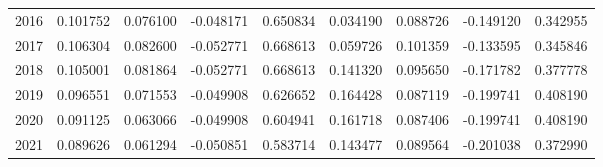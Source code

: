 \begin{table}[!ht]
\begin{tabularx}{\textwidth}{XXXXXXXXX}
    2016 &   0.101752 &     0.076100 & -0.048171 &  0.650834 &  0.034190 &    0.088726 & -0.149120 & 0.342955 \\
    2017 &   0.106304 &     0.082600 & -0.052771 &  0.668613 &  0.059726 &    0.101359 & -0.133595 & 0.345846 \\
    2018 &   0.105001 &     0.081864 & -0.052771 &  0.668613 &  0.141320 &    0.095650 & -0.171782 & 0.377778 \\
    2019 &   0.096551 &     0.071553 & -0.049908 &  0.626652 &  0.164428 &    0.087119 & -0.199741 & 0.408190 \\
    2020 &   0.091125 &     0.063066 & -0.049908 &  0.604941 &  0.161718 &    0.087406 & -0.199741 & 0.408190 \\
    2021 &   0.089626 &     0.061294 & -0.050851 &  0.583714 &  0.143477 &    0.089564 & -0.201038 & 0.372990 \\
    \bottomrule
    \end{tabularx}
\end{table}
